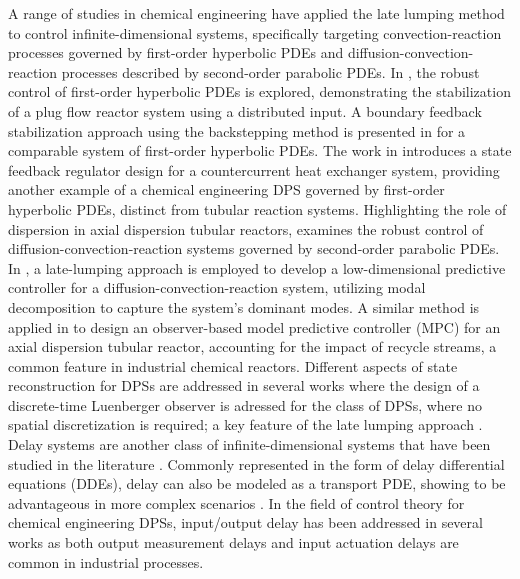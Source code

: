 A range of studies in chemical engineering have applied the late lumping method to control infinite-dimensional systems, specifically targeting convection-reaction processes governed by first-order hyperbolic PDEs and diffusion-convection-reaction processes described by second-order parabolic PDEs.
In \cite{christofides1996feedback}, the robust control of first-order hyperbolic PDEs is explored, demonstrating the stabilization of a plug flow reactor system using a distributed input.
A boundary feedback stabilization approach using the backstepping method is presented in \cite{krstic2008backstepping} for a comparable system of first-order hyperbolic PDEs.
The work in \cite{xu2016state} introduces a state feedback regulator design for a countercurrent heat exchanger system, providing another example of a chemical engineering DPS governed by first-order hyperbolic PDEs, distinct from tubular reaction systems.
Highlighting the role of dispersion in axial dispersion tubular reactors, \cite{christofides1998robust} examines the robust control of diffusion-convection-reaction systems governed by second-order parabolic PDEs.
In \cite{dubljevic2006predictive2}, a late-lumping approach is employed to develop a low-dimensional predictive controller for a diffusion-convection-reaction system, utilizing modal decomposition to capture the system's dominant modes.
A similar method is applied in \cite{khatibi2021model} to design an observer-based model predictive controller (MPC) for an axial dispersion tubular reactor, accounting for the impact of recycle streams, a common feature in industrial chemical reactors.
Different aspects of state reconstruction for DPSs are addressed in several works where the design of a discrete-time Luenberger observer is adressed for the class of DPSs, where no spatial discretization is required; a key feature of the late lumping approach  \cite{dochain2000state, dochain2001state, alonso2004optimal, ali2015review}.
Delay systems are another class of infinite-dimensional systems that have been studied in the literature \cite{curtainbook}. 
Commonly represented in the form of delay differential equations (DDEs), delay can also be modeled as a transport PDE, showing to be advantageous in more complex scenarios \cite{krstic2009book}. In the field of control theory for chemical engineering DPSs, input/output delay has been addressed in several works as both output measurement delays and input actuation delays are common in industrial processes. 
